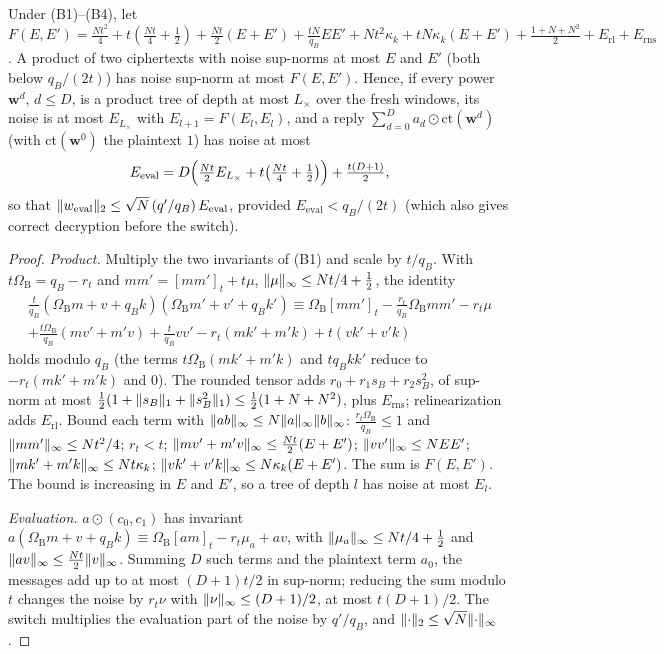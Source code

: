 \begin{proposition}\label{prop:bpsi}
Under (B1)--(B4), let $F(E,E')=\tfrac{Nt^2}4+t(\tfrac{Nt}4+\tfrac12)+\tfrac{Nt}2(E+E')+\tfrac{tN}{q_B}EE'+Nt^2\kappa_k+tN\kappa_k(E+E')+\tfrac{1+N+N^2}2+E_{\mathrm{rl}}+E_{\mathrm{rns}}$. A product of two ciphertexts with noise sup-norms at most $E$ and $E'$ (both below $q_B/(2t)$) has noise sup-norm at most $F(E,E')$. Hence, if every power $\mathbf w^d$, $d\le D$, is a product tree of depth at most $L_\times$ over the fresh windows, its noise is at most $E_{L_\times}$ with $E_{l+1}=F(E_l,E_l)$, and a reply $\sum_{d=0}^Da_d\odot\mathrm{ct}(\mathbf w^d)$ (with $\mathrm{ct}(\mathbf w^0)$ the plaintext $1$) has noise at most
\[
  E_{\mathrm{eval}}=D\Bigl(\tfrac{Nt}2E_{L_\times}+t\bigl(\tfrac{Nt}4+\tfrac12\bigr)\Bigr)+\tfrac{t(D+1)}2 ,
\]
so that $\lVert w_{\mathrm{eval}}\rVert_2\le\sqrt N\,(q'/q_B)\,E_{\mathrm{eval}}$, provided $E_{\mathrm{eval}}<q_B/(2t)$ (which also gives correct decryption before the switch).
\end{proposition}
\begin{proof}
\emph{Product.} Multiply the two invariants of (B1) and scale by $t/q_B$. With $t\Omega_{\mathrm B}=q_B-r_t$ and $mm'=[mm']_t+t\mu$, $\lVert \mu\rVert_\infty\le Nt/4+\tfrac12$, the identity
\begin{multline*}
  \tfrac t{q_B}(\Omega_{\mathrm B}m+v+q_Bk)(\Omega_{\mathrm B}m'+v'+q_Bk')\equiv\Omega_{\mathrm B}[mm']_t-\tfrac{r_t}{q_B}\Omega_{\mathrm B}mm'-r_t\mu\\
  +\tfrac{t\Omega_{\mathrm B}}{q_B}(mv'+m'v)+\tfrac t{q_B}vv'-r_t(mk'+m'k)+t(vk'+v'k)
\end{multline*}
holds modulo $q_B$ (the terms $t\Omega_{\mathrm B}(mk'+m'k)$ and $tq_Bkk'$ reduce to $-r_t(mk'+m'k)$ and $0$). The rounded tensor adds $r_0+r_1s_B+r_2s_B^2$, of sup-norm at most $\tfrac12(1+\lVert s_B\rVert_1+\lVert s_B^2\rVert_1)\le\tfrac12(1+N+N^2)$, plus $E_{\mathrm{rns}}$; relinearization adds $E_{\mathrm{rl}}$. Bound each term with $\lVert ab\rVert_\infty\le N\lVert a\rVert_\infty\lVert b\rVert_\infty$: $\tfrac{r_t\Omega_{\mathrm B}}{q_B}\le1$ and $\lVert mm'\rVert_\infty\le Nt^2/4$; $r_t<t$; $\lVert mv'+m'v\rVert_\infty\le\tfrac{Nt}2(E+E')$; $\lVert vv'\rVert_\infty\le NEE'$; $\lVert mk'+m'k\rVert_\infty\le Nt\kappa_k$; $\lVert vk'+v'k\rVert_\infty\le N\kappa_k(E+E')$. The sum is $F(E,E')$. The bound is increasing in $E$ and $E'$, so a tree of depth $l$ has noise at most $E_l$.

\emph{Evaluation.} $a\odot(c_0,c_1)$ has invariant $a(\Omega_{\mathrm B}m+v+q_Bk)\equiv\Omega_{\mathrm B}[am]_t-r_t\mu_a+av$, with $\lVert \mu_a\rVert_\infty\le Nt/4+\tfrac12$ and $\lVert av\rVert_\infty\le\tfrac{Nt}2\lVert v\rVert_\infty$. Summing $D$ such terms and the plaintext term $a_0$, the messages add up to at most $(D+1)t/2$ in sup-norm; reducing the sum modulo $t$ changes the noise by $r_t\nu$ with $\lVert \nu\rVert_\infty\le(D+1)/2$, at most $t(D+1)/2$. The switch multiplies the evaluation part of the noise by $q'/q_B$, and $\lVert \cdot\rVert_2\le\sqrt N\lVert \cdot\rVert_\infty$.
\end{proof}

